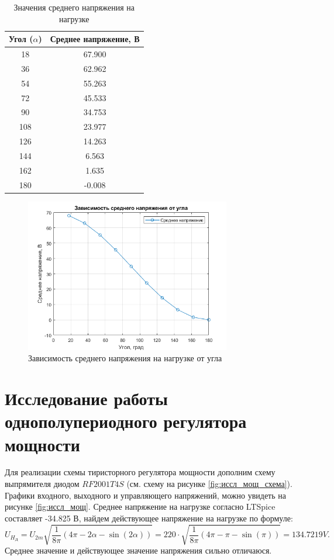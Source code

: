 \begin{table}[H]
    \centering
    \caption{Значения среднего напряжения на нагрузке}
    \label{tab:средн_напр_на_нагрузке}
    \begin{tabular}{|c|c|}
        \hline
        Угол ($\alpha$) & Среднее напряжение, В \\
        \hline
        18 & 67.900 \\
        36 & 62.962 \\
        54 & 55.263 \\
        72 & 45.533 \\
        90 & 34.753 \\
        108 & 23.977 \\
        126 & 14.263 \\
        144 & 6.563 \\
        162 & 1.635 \\
        180 & -0.008 \\
        \hline
    \end{tabular}
\end{table}

\begin{figure}[H]
    \centering
    \includegraphics[width=0.8\textwidth]{figs/напр_ср_альфа.png}
    \caption{Зависимость среднего напряжения на нагрузке от угла}
    \label{fig:напр_ср_альфа}
\end{figure}

\newpage

\section*{Исследование работы однополупериодного регулятора
мощности}

Для реализации схемы тиристорного регулятора мощности дополним схему выпрямителя диодом
$RF2001T4S$ (см. схему на рисунке \ref{fig:иссл_мощ_схема}). Графики входного, выходного
и управляющего напряжений, можно увидеть на рисунке \ref{fig:иссл_мощ}.
Среднее напряжение на нагрузке согласно LTSpice составляет -34.825 В, найдем 
действующее напряжение на нагрузке по формуле:
\begin{equation*}
    U_{H_\text{Д}}=U_{2m}\sqrt{
        \frac{1}{8\pi}(4\pi-2\alpha-\sin(2\alpha))
    }=220\cdot\sqrt{\frac{1}{8\pi}(4\pi-\pi-\sin(\pi))}
    =134.7219 V.
\end{equation*}
Среднее значение и действующее значение напряжения сильно отличаюся.

